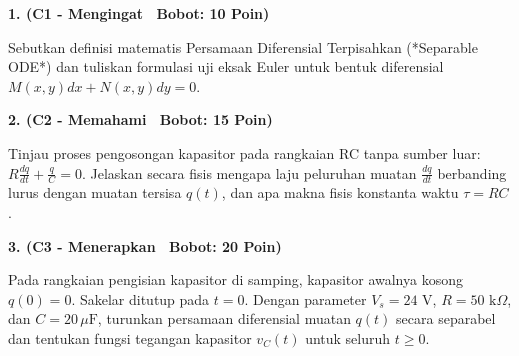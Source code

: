 \documentclass[10pt,a4paper]{article}
\begin{document}
\par
\vspace{1mm}

\noindent\textbf{1. (C1 - Mengingat \textbar\ Bobot: 10 Poin)}\par\vspace{0.8mm}
{\footnotesize Sebutkan definisi matematis Persamaan Diferensial Terpisahkan (*Separable ODE*) dan tuliskan formulasi uji eksak Euler untuk bentuk diferensial $M(x,y)dx + N(x,y)dy = 0$.}\par

\vspace{2.5mm}

\noindent\textbf{2. (C2 - Memahami \textbar\ Bobot: 15 Poin)}\par\vspace{0.8mm}
{\footnotesize Tinjau proses pengosongan kapasitor pada rangkaian RC tanpa sumber luar: $R \frac{dq}{dt} + \frac{q}{C} = 0$. Jelaskan secara fisis mengapa laju peluruhan muatan $\frac{dq}{dt}$ berbanding lurus dengan muatan tersisa $q(t)$, dan apa makna fisis konstanta waktu $\tau = RC$.}\par

\vspace{2.5mm}

\noindent\textbf{3. (C3 - Menerapkan \textbar\ Bobot: 20 Poin)}\par\vspace{0.8mm}
\noindent\begin{minipage}[t]{0.60\textwidth}%
  {\footnotesize Pada rangkaian pengisian kapasitor di samping, kapasitor awalnya kosong $q(0) = 0$. Sakelar ditutup pada $t=0$. Dengan parameter $V_s = 24\text{ V}$, $R = 50\text{ k}\Omega$, dan $C = 20\,\mu\text{F}$, turunkan persamaan diferensial muatan $q(t)$ secara separabel dan tentukan fungsi tegangan kapasitor $v_C(t)$ untuk seluruh $t \ge 0$.}%
\end{minipage}%
\hfill%
\begin{minipage}[t]{0.37\textwidth}%
  \centering
\end{minipage}\par
\end{document}
